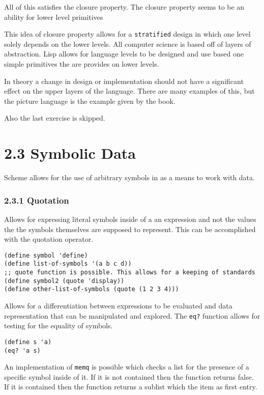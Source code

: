 \documentclass[11pt]{article}
\begin{document}
\begin{enumerate}
All of this satisfies the closure property. The closure property seems
to be an ability for lower level primitives

This idea of closure property allows for a \texttt{stratified} design in which
one level solely depends on the lower levels. All computer science is
based off of layers of abstraction. Lisp allows for language levels to
be designed and use based one simple primitives the are provides on
lower levels.

In theory a change in design or implementation should not have a
significant effect on the upper layers of the language. There are many
examples of this, but the picture language is the example given by the
book.

Also the last exercise is skipped.
\end{enumerate}

\section{2.3 Symbolic Data}
\label{sec:org9c397f3}
Scheme allows for the use of arbitrary symbols in as a means to work with
data.

\subsubsection{2.3.1 Quotation}
\label{sec:org98ca602}

Allows for expressing literal symbols inside of a an expression and not
the values the the symbols themselves are supposed to represent. This can
be accomplished with the quotation operator.

\begin{verbatim}
(define symbol 'define)
(define list-of-symbols '(a b c d))
;; quote function is possible. This allows for a keeping of standards
(define symbol2 (quote 'display))
(define other-list-of-symbols (quote (1 2 3 4)))
\end{verbatim}

Allows for a differentiation between expressions to be evaluated and data
representation that can be manipulated and explored. The \texttt{eq?} function
allows for testing for the equality of symbols.

\begin{verbatim}
(define s 'a)
(eq? 'a s)
\end{verbatim}

An implementation of \texttt{memq} is possible which checks a list for the presence
of a specific symbol inside of it. If it is not contained then the function
returns false. If it is contained then the function returns a sublist
which the item as first entry.
\end{document}
